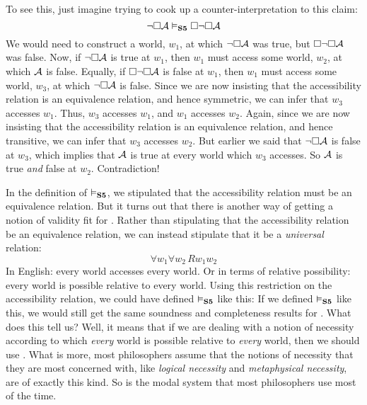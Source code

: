 To see this, just imagine trying to cook up a counter-interpretation to this claim:
\[
	\neg\Box\mathcal{A} \vDash_{\mathbf{S5}}  \Box \neg\Box \mathcal{A}
\]
We would need to construct a world, $w_1$, at which $\neg\Box\mathcal{A}$ was true, but $\Box \neg\Box \mathcal{A}$ was false.
Now, if $\neg\Box\mathcal{A}$ is true at $w_1$, then $w_1$ must access some world, $w_2$, at which $\mathcal{A}$ is false. Equally, if $\Box \neg\Box \mathcal{A}$ is false at $w_1$, then $w_1$ must access some world, $w_3$, at which $\neg\Box \mathcal{A}$ is false. Since we are now insisting that the accessibility relation is an equivalence relation, and hence symmetric, we can infer that $w_3$ accesses $w_1$. Thus, $w_3$ accesses $w_1$, and $w_1$ accesses $w_2$. Again, since we are now insisting that the accessibility relation is an equivalence relation, and hence transitive, we can infer that $w_3$ accesses $w_2$. But earlier we said that $\neg\Box \mathcal{A}$ is false at $w_3$, which implies that $\mathcal{A}$ is true at every world which $w_3$ accesses. So $\mathcal{A}$ is true \emph{and} false at $w_2$. Contradiction!

In the definition of $\vDash_{\mathbf{S5}} $, we stipulated that the accessibility relation must be an equivalence relation. But it turns out that there is another way of getting a notion of validity fit for \mlSfive. Rather than stipulating that the accessibility relation be an equivalence relation, we can instead stipulate that it be a \emph{universal} relation:
\[\forall w_1\forall w_2\, Rw_1w_2\]
In English: every world accesses every world. Or in terms of relative possibility: every world is possible relative to every world. Using this restriction on the accessibility relation, we could have defined $\vDash_{\mathbf{S5}} $ like this:
If we defined $\vDash_{\mathbf{S5}} $ like this, we would still get the same soundness and completeness results for \mlSfive. What does this tell us? Well, it means that if we are dealing with a notion of necessity according to which \emph{every} world is possible relative to \emph{every} world, then we should use \mlSfive. What is more, most philosophers assume that the notions of necessity that they are most concerned with, like \emph{logical necessity} and \emph{metaphysical necessity}, are of exactly this kind. So \mlSfive{} is the modal system that most philosophers use most of the time.

